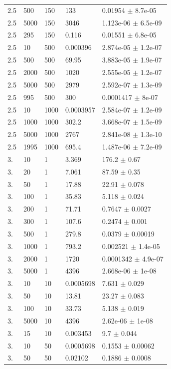 \begin{longtable}{lllll}
	2.5 & 500 & 150 & 133 & 0.01954 $\pm$ 8.7e-05 \\
	2.5 & 5000 & 150 & 3046 & 1.123e-06 $\pm$ 6.5e-09 \\
	2.5 & 295 & 150 & 0.116 & 0.01551 $\pm$ 6.8e-05 \\
	2.5 & 10 & 500 & 0.000396 & 2.874e-05 $\pm$ 1.2e-07 \\
	2.5 & 500 & 500 & 69.95 & 3.883e-05 $\pm$ 1.9e-07 \\
	2.5 & 2000 & 500 & 1020 & 2.555e-05 $\pm$ 1.2e-07 \\
	2.5 & 5000 & 500 & 2979 & 2.592e-07 $\pm$ 1.3e-09 \\
	2.5 & 995 & 500 & 300 & 0.0001417 $\pm$ 8e-07 \\
	2.5 & 10 & 1000 & 0.0003957 & 2.584e-07 $\pm$ 1.2e-09 \\
	2.5 & 1000 & 1000 & 302.2 & 3.668e-07 $\pm$ 1.5e-09 \\
	2.5 & 5000 & 1000 & 2767 & 2.841e-08 $\pm$ 1.3e-10 \\
	2.5 & 1995 & 1000 & 695.4 & 1.487e-06 $\pm$ 7.2e-09 \\
	3. & 10 & 1 & 3.369 & 176.2 $\pm$ 0.67 \\
	3. & 20 & 1 & 7.061 & 87.59 $\pm$ 0.35 \\
	3. & 50 & 1 & 17.88 & 22.91 $\pm$ 0.078 \\
	3. & 100 & 1 & 35.83 & 5.118 $\pm$ 0.024 \\
	3. & 200 & 1 & 71.71 & 0.7647 $\pm$ 0.0027 \\
	3. & 300 & 1 & 107.6 & 0.2474 $\pm$ 0.001 \\
	3. & 500 & 1 & 279.8 & 0.0379 $\pm$ 0.00019 \\
	3. & 1000 & 1 & 793.2 & 0.002521 $\pm$ 1.4e-05 \\
	3. & 2000 & 1 & 1720 & 0.0001342 $\pm$ 4.9e-07 \\
	3. & 5000 & 1 & 4396 & 2.668e-06 $\pm$ 1e-08 \\
	3. & 10 & 10 & 0.0005698 & 7.631 $\pm$ 0.029 \\
	3. & 50 & 10 & 13.81 & 23.27 $\pm$ 0.083 \\
	3. & 100 & 10 & 33.73 & 5.138 $\pm$ 0.019 \\
	3. & 5000 & 10 & 4396 & 2.62e-06 $\pm$ 1e-08 \\
	3. & 15 & 10 & 0.003453 & 9.7 $\pm$ 0.044 \\
	3. & 10 & 50 & 0.0005698 & 0.1553 $\pm$ 0.00062 \\
	3. & 50 & 50 & 0.02102 & 0.1886 $\pm$ 0.0008 \\

\end{longtable}
